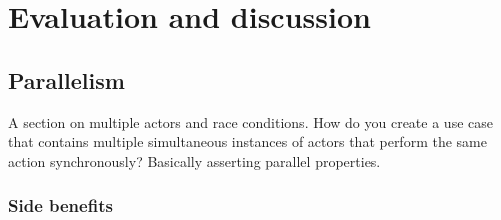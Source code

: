 \chapter{Evaluation and discussion}

\section{Parallelism}
A section on multiple actors and race conditions. How do you create a use case that contains multiple simultaneous instances of actors that perform the same action synchronously? Basically asserting parallel properties.

\subsection{Side benefits}

